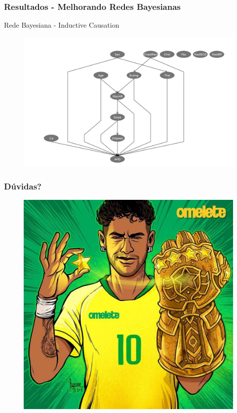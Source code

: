 \documentclass{beamer}
\theoremstyle{theorem}
\theoremstyle{definition}
\begin{document}
\begin{frame}
\frametitle{Resultados - Melhorando Redes Bayesianas}
\begin{block}{Rede Bayesiana - Inductive Causation}
\end{block}
\begin{figure}[htbp]
	\includegraphics[scale=.21]{fig/BNIC-grafo.png}
\label{fig1}
\end{figure}
\end{frame}


\begin{frame}
\frametitle{Dúvidas?}	
\begin{figure}[htbp]
		\includegraphics[scale=.25]{fig/ney.jpg}
\end{figure}
\end{frame}
\end{document}
